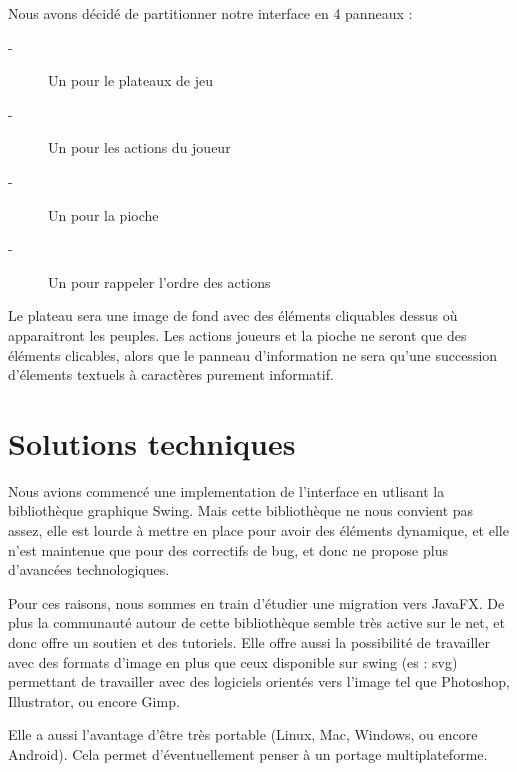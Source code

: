 Nous avons décidé de partitionner notre interface en 4 panneaux :
		\begin{description}
			\item[-]Un pour le plateaux de jeu
			\item[-]Un pour les actions du joueur
			\item[-]Un pour la pioche
			\item[-]Un pour rappeler l'ordre des actions
		\end{description}	
		
		Le plateau sera une image de fond avec des éléments cliquables dessus où apparaitront les peuples. Les actions joueurs et la pioche ne seront que des éléments clicables, alors	que le panneau d'information ne sera qu'une succession d'élements textuels à caractères purement informatif.  
	\section{Solutions techniques}
		Nous avions commencé une implementation de l'interface en utlisant la bibliothèque graphique Swing. Mais cette bibliothèque ne nous convient pas assez, elle est lourde à mettre en place pour avoir des éléments dynamique, et elle n'est maintenue que pour des correctifs de bug, et donc ne propose plus d'avancées technologiques. 
		
		Pour ces raisons, nous sommes en train d'étudier une migration vers JavaFX. De plus la communauté autour de cette bibliothèque semble très active sur le net, et donc offre un soutien et des tutoriels. Elle offre aussi la possibilité de travailler avec des formats d'image en plus que ceux disponible sur swing (es : svg) permettant de travailler avec des logiciels orientés vers l'image tel que Photoshop\up{\copyright}, Illustrator\up{\copyright}, ou encore Gimp\up{\copyright}. 
		
		Elle a aussi l'avantage d'être très portable (Linux, Mac, Windows, ou encore Android). Cela permet d'éventuellement penser à un portage multiplateforme.
